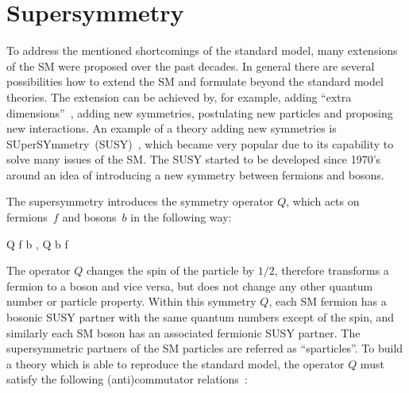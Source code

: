 



\section{Supersymmetry~\label{sec:SUSY}}

To address the mentioned shortcomings of the standard model, many extensions of the SM were proposed over the past decades. In general there are several possibilities how to extend the SM and formulate beyond the standard model theories. The extension can be achieved by, for example, adding ``extra dimensions''~\cite{Patrignani:2016xqp}, adding new symmetries, postulating new particles and proposing new interactions. An example of a theory adding new symmetries is SUperSYmmetry~(SUSY)~\cite{Martin:1997ns}, which became very popular due to its capability to solve many issues of the SM. The SUSY started to be developed since 1970's around an idea of introducing a new symmetry between fermions and bosons.
  

The supersymmetry introduces the symmetry operator $Q$, which acts on fermions~$f$ and bosons~$b$ in the following way:

{
Q \mid f \rangle \to \mid b \rangle \to  , \; Q \mid b \rangle \to \mid f \rangle
}

The operator $Q$ changes the spin of the particle by $1/2$, therefore transforms a fermion to a boson and vice versa, but does not change any other quantum number or particle property. Within this symmetry $Q$, each SM fermion has a bosonic SUSY partner with the same quantum numbers except of the spin, and similarly each SM boson has an associated fermionic SUSY partner. The supersymmetric partners of the SM particles are referred as ``sparticles''. To build a theory which is able to reproduce the standard model, the operator $Q$ must satisfy the following (anti)commutator relations~\cite{Haag:1974qh, Coleman:1967ad}:

